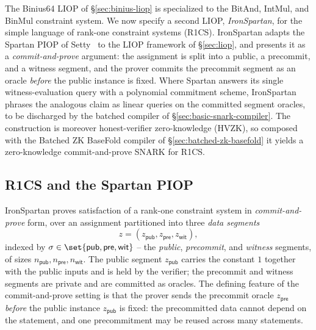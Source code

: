 \documentclass{article}
\theoremstyle{definition}
\begin{document}
The Binius64 LIOP of \S\ref{sec:binius-liop} is specialized to the BitAnd, IntMul, and BinMul constraint system. We now specify a second LIOP, \emph{IronSpartan}, for the simple language of rank-one constraint systems (R1CS). IronSpartan adapts the Spartan PIOP of Setty~\cite{Setty:2020aa} to the LIOP framework of \S\ref{sec:liop}, and presents it as a \emph{commit-and-prove} argument: the assignment is split into a public, a precommit, and a witness segment, and the prover commits the precommit segment as an oracle \emph{before} the public instance is fixed. Where Spartan answers its single witness-evaluation query with a polynomial commitment scheme, IronSpartan phrases the analogous claim as linear queries on the committed segment oracles, to be discharged by the batched compiler of \S\ref{sec:basic-snark-compiler}. The construction is moreover honest-verifier zero-knowledge (HVZK), so composed with the Batched ZK BaseFold compiler of \S\ref{sec:batched-zk-basefold} it yields a zero-knowledge commit-and-prove SNARK for R1CS.

\subsection{R1CS and the Spartan PIOP}
\label{sec:r1cs-spartan}

IronSpartan proves satisfaction of a rank-one constraint system in \emph{commit-and-prove} form, over an assignment partitioned into three \emph{data segments}
\[
  z = (z_{\textsf{pub}}, z_{\textsf{pre}}, z_{\textsf{wit}}),
\]
indexed by $\sigma \in \set{\textsf{pub}, \textsf{pre}, \textsf{wit}}$ -- the \emph{public}, \emph{precommit}, and \emph{witness} segments, of sizes $n_{\textsf{pub}}, n_{\textsf{pre}}, n_{\textsf{wit}}$. The public segment $z_{\textsf{pub}}$ carries the constant $1$ together with the public inputs and is held by the verifier; the precommit and witness segments are private and are committed as oracles. The defining feature of the commit-and-prove setting is that the prover sends the precommit oracle $z_{\textsf{pre}}$ \emph{before} the public instance $z_{\textsf{pub}}$ is fixed: the precommitted data cannot depend on the statement, and one precommitment may be reused across many statements.
\end{document}

